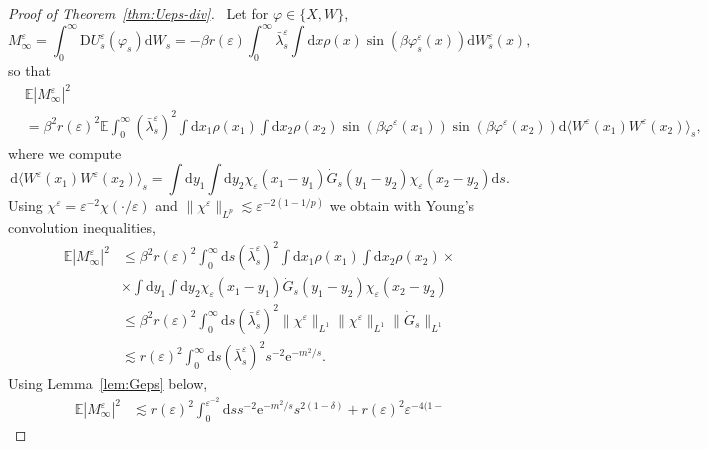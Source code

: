 \documentclass[11pt, a4paper]{scrartcl}
\numberwithin{equation}{section}
\theoremstyle{plain}
\theoremstyle{remark}
\newcommand{\Iota}{\mathrm{I}}
\newcommand{\mathD}{\mathrm{D}}
\newcommand{\mathd}{\mathrm{d}}
\newcommand{\mathe}{\mathrm{e}}
\newcommand{\tmtextbf}[1]{\text{{\bfseries{#1}}}}
\begin{document}
\begin{proof}[Proof of Theorem~\ref{thm:Ueps-div}]
  \tmtextbf{$(\Iota \Iota \Iota^{\varepsilon})$} \ Let for $\varphi\in\{X,W\}$,
  \[ M^{\varepsilon}_{\infty} = \int_0^{\infty} \mathD
     U^{\varepsilon}_s (\varphi_s) \mathd W_s = - \beta r (\varepsilon)
     \int_0^{\infty} \bar{\lambda}^{\varepsilon}_s \int \mathd x \rho (x) \sin
     (\beta \varphi_s^{\varepsilon} (x)) \mathd W_s^{\varepsilon} (x), \]
  so that
  {\small\begin{align*}
    &\mathbb{E} | M_{\infty}^{\varepsilon} |^2 \\
    &= \beta^2 r (\varepsilon)^2
     \mathbb{E} \int_0^{\infty}  (\bar{\lambda}_s^{\varepsilon})^2  \int \mathd x_1
     \rho (x_1)  \int \mathd x_2 \rho (x_2) \sin (\beta \varphi^{\varepsilon}
     (x_1)) \sin (\beta \varphi^{\varepsilon} (x_2)) \mathd \langle
     W^{\varepsilon} (x_1) W^{\varepsilon} (x_2) \rangle_s, 
  \end{align*}}
  where we compute
  \[ \mathd \langle W^{\varepsilon} (x_1) W^{\varepsilon} (x_2) \rangle_s =
     \int \mathd y_1 \int \mathd y_2 \chi_{\varepsilon} (x_1 - y_1) \dot{G}_s
     (y_1 - y_2) \chi_{\varepsilon} (x_2 - y_2) \mathd s. \]
  Using $\chi^{\varepsilon} = \varepsilon^{- 2} \chi (\cdot / \varepsilon)$
  and $\| \chi^{\varepsilon} \|_{L^p} \lesssim \varepsilon^{- 2 (1 - 1 / p)}$
  we obtain with Young's convolution inequalities,
  \[ \begin{aligned}
       \mathbb{E} | M_{\infty}^{\varepsilon} |^2 &\leqslant  \beta^2 r
       (\varepsilon)^2 \int_0^{\infty} \mathd s (\bar{\lambda}_s^{\varepsilon})^2 
       \int \mathd x_1 \rho (x_1)  \int \mathd x_2 \rho (x_2) \times\\
       &\times\int \mathd y_1
       \int \mathd y_2 \chi_{\varepsilon} (x_1 - y_1) \dot{G}_s (y_1 - y_2)
       \chi_{\varepsilon} (x_2 - y_2)\\
       &\leqslant  \beta^2 r (\varepsilon)^2  \int_0^{\infty} \mathd s
       (\bar{\lambda}_s^{\varepsilon})^2  \| \chi^{\varepsilon} \|_{L^1} \|
       \chi^{\varepsilon} \|_{L^1} \| \dot{G}_s \|_{L^1}\\
       & \lesssim  r (\varepsilon)^2  \int_0^{\infty} \mathd s
       (\bar{\lambda}_s^{\varepsilon})^2 s^{- 2} \mathe^{- m^2 / s}.
     \end{aligned} \]
  Using Lemma~\ref{lem:Geps} below,
  \[ \begin{aligned}
       \mathbb{E} | M_{\infty}^{\varepsilon} |^2 & \lesssim  r
       (\varepsilon)^2  \int_0^{\varepsilon^{- 2}} \mathd ss^{- 2} \mathe^{-
       m^2 / s} s^{2 (1 - \delta)} + r (\varepsilon)^2 \varepsilon^{- 4 (1 -
}
\end{aligned}\]
\end{proof}
\end{document}
